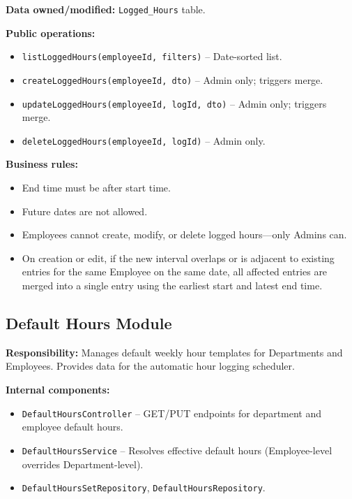 \documentclass[11pt,a4paper]{article}
\begin{document}
\textbf{Data owned/modified:} \texttt{Logged\_Hours} table.

\textbf{Public operations:}
\begin{itemize}[leftmargin=1.5em]
    \item \texttt{listLoggedHours(employeeId, filters)} -- Date-sorted list.
    \item \texttt{createLoggedHours(employeeId, dto)} -- Admin only; triggers merge.
    \item \texttt{updateLoggedHours(employeeId, logId, dto)} -- Admin only; triggers merge.
    \item \texttt{deleteLoggedHours(employeeId, logId)} -- Admin only.
\end{itemize}

\textbf{Business rules:}
\begin{itemize}[leftmargin=1.5em]
    \item End time must be after start time.
    \item Future dates are not allowed.
    \item Employees cannot create, modify, or delete logged hours---only Admins can.
    \item On creation or edit, if the new interval overlaps or is adjacent to existing entries for the same Employee on the same date, all affected entries are merged into a single entry using the earliest start and latest end time.
\end{itemize}

\subsection{Default Hours Module}

\textbf{Responsibility:} Manages default weekly hour templates for Departments and Employees. Provides data for the automatic hour logging scheduler.

\textbf{Internal components:}
\begin{itemize}[leftmargin=1.5em]
    \item \texttt{DefaultHoursController} -- GET/PUT endpoints for department and employee default hours.
    \item \texttt{DefaultHoursService} -- Resolves effective default hours (Employee-level overrides Department-level).
    \item \texttt{DefaultHoursSetRepository}, \texttt{DefaultHoursRepository}.
\end{itemize}
\end{document}

